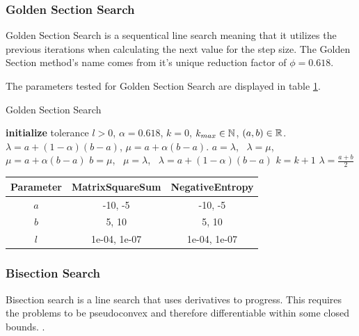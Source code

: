 \documentclass[a4paper,english,titlepage,12pt]{article}
\newcommand{\R}{\ensuremath\mathbb{R}}
\newcommand{\N}{\ensuremath\mathbb{N}}
\begin{document}
\subsubsection{Golden Section Search}

Golden Section Search is a sequentical line search meaning that it utilizes the previous iterations when calculating the next value for the step size. The Golden Section method's name comes from it's unique reduction factor of $\phi = 0.618$. \cite{book:nonlinear_programming}

The parameters tested for Golden Section Search are displayed in table \ref{tab:params_GoldenSectionSearch}.

\begin{algorithm}[H]
\caption{Golden Section Search}
\label{alg_golden_section}
\begin{algorithmic}[1]
\STATE \textbf{initialize} tolerance $l > 0$, $\alpha = 0.618$, $k = 0$, $k_{max} \in \N$, $(a, b) \in \R$.
\STATE $\lambda = a + (1 - \alpha) (b - a)$, $\mu = a + \alpha (b - a)$.
    \IF{$\theta(\lambda) > \theta(\mu)$}
        \STATE $a = \lambda$, \ $\lambda = \mu$, \ $\mu = a + \alpha (b - a)$
    \ELSE
        \STATE $b = \mu$, \ $\mu = \lambda$, \ $\lambda = a + (1 - \alpha) (b - a)$
    \ENDIF
    \STATE $k = k + 1$
\ENDWHILE
\RETURN $\lambda = \frac{a + b}{2}$
\end{algorithmic}
\end{algorithm}

\begin{table}[H]
\label{tab:params_GoldenSectionSearch}
\centering
{}
\begin{tabular}{|c|c|c|}
\hline
\rowcolor{gray!25}
Parameter & MatrixSquareSum & NegativeEntropy \\
\hline
$a$ & -10, -5 & -10, -5 \\
$b$ & 5, 10 & 5, 10 \\
$l$ & 1e-04, 1e-07 & 1e-04, 1e-07 \\
\hline
\end{tabular}
\end{table}


\subsubsection{Bisection Search}


Bisection search is a line search that uses derivatives to progress. This requires the problems to be pseudoconvex and therefore differentiable within some closed bounds. \cite{book:nonlinear_programming}.
\end{document}
